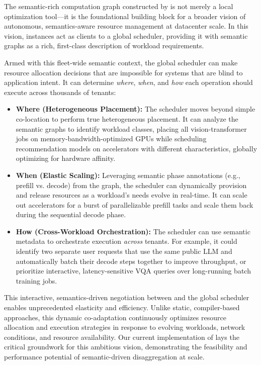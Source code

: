 The semantic-rich computation graph constructed by \sys is not merely a local optimization tool---it is the foundational building block for a broader vision of autonomous, semantics-aware resource management at datacenter scale. In this vision, \sys instances act as clients to a global scheduler, providing it with semantic graphs as a rich, first-class description of workload requirements.

Armed with this fleet-wide semantic context, the global scheduler can make resource allocation decisions that are impossible for systems that are blind to application intent. It can determine \textit{where}, \textit{when}, and \textit{how} each operation should execute across thousands of tenants:

\begin{itemize}[left=0pt]
    \item \textbf{Where (Heterogeneous Placement):} The scheduler mo\-ves beyond simple co-location to perform true heterogeneous placement. It can analyze the semantic graphs to identify workload classes, placing all vision-transformer jobs on memory-bandwidth-optimized GPUs while scheduling recommendation models on accelerators with different characteristics, globally optimizing for hardware affinity.
    
    \item \textbf{When (Elastic Scaling):} Leveraging semantic phase annotations (e.g., prefill vs. decode) from the graph, the scheduler can dynamically provision and release resources as a workload's needs evolve in real-time. It can scale out accelerators for a burst of parallelizable prefill tasks and scale them back during the sequential decode phase.
    
    \item \textbf{How (Cross-Workload Orchestration):} The scheduler can use semantic metadata to orchestrate execution \textit{across} tenants. For example, it could identify two separate user requests that use the same public LLM and automatically batch their decode steps together to improve throughput, or prioritize interactive, latency-sensitive VQA queries over long-running batch training jobs.
\end{itemize}

This interactive, semantics-driven negotiation between \sys and the global scheduler enables unprecedented elasticity and efficiency. 
Unlike static, compiler-based approaches, this dynamic co-adaptation continuously optimizes resource allocation and execution strategies in response to evolving workloads, network conditions, and resource availability. 
Our current implementation of \sys lays the critical groundwork for this ambitious vision, demonstrating the feasibility and performance potential of semantic-driven disaggregation at scale.
